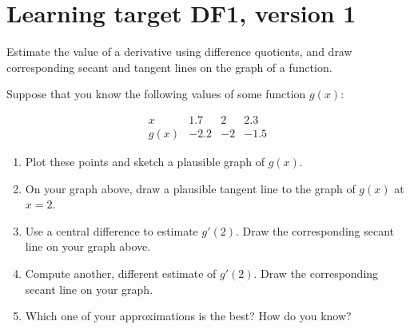 
\usepackage{pgfplots}



\section{Learning target DF1, version 1}

Estimate the value of a derivative using difference quotients, and draw corresponding secant and tangent lines on the graph of a function.

\hrulefill


\everymath{\displaystyle}

Suppose that you know the following values of some function $g(x)$:

\[
\begin{array}{c||r|r|r}
      x  &  1.7 &  2   &  2.3 \\\hline
    g(x) & -2.2 & -2   & -1.5
\end{array}
\]
\begin{enumerate}[leftmargin=0pt]

\item Plot these points and sketch a plausible graph of $g(x)$.


\item On your graph above, draw a plausible tangent line to the graph of $g(x)$ at $x=2$.

\item Use a central difference to estimate $g'(2)$. Draw the corresponding secant line on your graph above.

\vfill

\item Compute another, different estimate of $g'(2)$. Draw the corresponding secant line on your graph.

\vfill

\item Which one of your approximations is the best? How do you know?

\vspace{1cm}

\end{enumerate}


